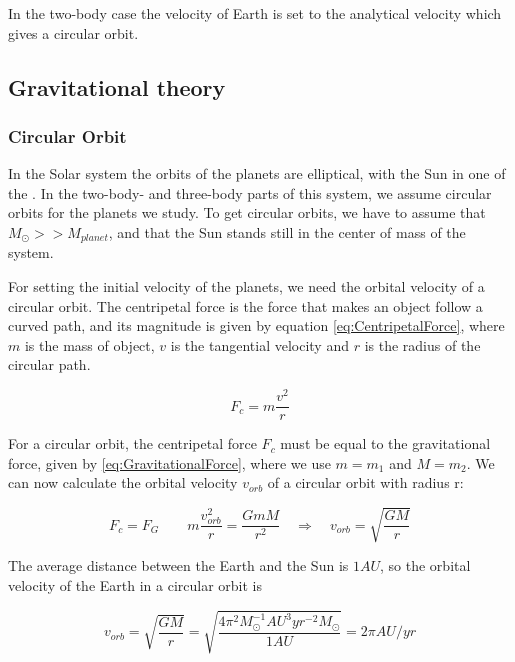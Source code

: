 \documentclass[norsk,a4paper,12pt]{article}
\begin{document}
In the two-body case the velocity of Earth is set to the analytical velocity which gives a circular orbit. 
 
\subsection{Gravitational theory}
\subsubsection{Circular Orbit}
In the Solar system the orbits of the planets are elliptical, with the Sun in one of the \cite{kepler}. In the two-body- and three-body parts of this system, we assume circular orbits for the planets we study. To get circular orbits, we have to assume that $M_{\odot} >> M_{planet}$, and that the Sun stands still in the center of mass of the system. \par
\vspace{3mm}

For setting the initial velocity of the planets, we need the orbital velocity of a circular orbit. The centripetal force is the force that makes an object follow a curved path, and its magnitude is given by equation \ref{eq:CentripetalForce}, where $m$ is the mass of object, $v$ is the tangential velocity and $r$ is the radius of the circular path. 

\begin{equation}
     F_c = m \frac{v^2}{r}
     \label{eq:CentripetalForce}
\end{equation}

For a circular orbit, the centripetal force $F_c$ must be equal to the gravitational force, given by \ref{eq:GravitationalForce}, where we use $m = m_1$ and $M =m_2$. We can now calculate the orbital velocity $v_{orb}$ of a circular orbit with radius r:

\begin{equation}
    F_c = F_G \quad \quad m \frac{v_{orb}^2}{r} = \frac{GmM}{r^2} \quad \Rightarrow \quad v_{orb} = \sqrt{\frac{GM}{r}}
    \label{eq:OrbitalVelocity}
\end{equation}

The average distance between the Earth and the Sun is $1 AU$, so the orbital velocity of the Earth in a circular orbit is

\begin{equation*}
    v_{orb} = \sqrt{\frac{GM}{r}} = \sqrt{\frac{ 4\pi^2 M_{\odot} ^{-1} AU^3 yr^{-2} M_{\odot}}{1 AU}} = 2\pi AU/yr 
\end{equation*}
\end{document}
